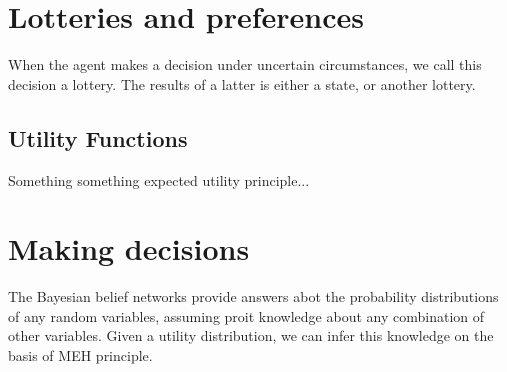 \section{Lotteries and preferences}
When the agent makes a decision under uncertain circumstances, we call this decision a lottery. The results of a latter is either a state, or another lottery.
\subsection{Utility Functions}

Something something expected utility principle...

\section{Making decisions}
    The Bayesian belief networks provide answers abot the probability distributions of any random variables, assuming proit knowledge about any combination of other variables. Given a utility distribution, we can infer this knowledge on the basis of MEH principle.

